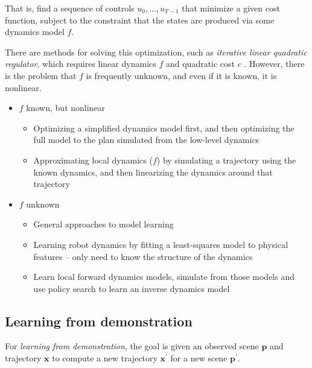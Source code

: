 \documentclass[12pt]{article}
\begin{document}
That is, find a sequence of controls $u_0,\ldots{},u_{T-1}$ that minimize a given cost function, subject to the constraint that the states are produced via some dynamics model $f$.

There are methods for solving this optimization, such as \textit{iterative linear quadratic regulator}, which requires linear dynamics $f$ and quadratic cost $c$ \citep{Li2004}. However, there is the problem that $f$ is frequently unknown, and even if it is known, it is nonlinear.

\begin{itemize}
\item $f$ known, but nonlinear
    \begin{itemize}
    \item Optimizing a simplified dynamics model first, and then optimizing the full model to the plan simulated from the low-level dynamics \citep{Mordatch2010}
    \item Approximating local dynamics ($f$) by simulating a trajectory using the known dynamics, and then linearizing the dynamics around that trajectory \citep{Kitaev2015}
    \end{itemize}

\item $f$ unknown
    \begin{itemize}
    \item General approaches to model learning \citep{Nguyen-Tuong2011}
    \item Learning robot dynamics by fitting a least-squares model to physical features -- only need to know the structure of the dynamics \citep{Xie2015}
    \item Learn local forward dynamics models, simulate from those models and use policy search to learn an inverse dynamics model \citep{Levine2015,Han2015}
    \end{itemize}

\end{itemize}

\subsection*{Learning from demonstration}

For \textit{learning from demonstration}, the goal is given an observed scene $\textbf{p}$ and trajectory $\textbf{x}$ to compute a new trajectory $\textbf{x}^\prime$ for a new scene $\textbf{p}^\prime$.
\end{document}
